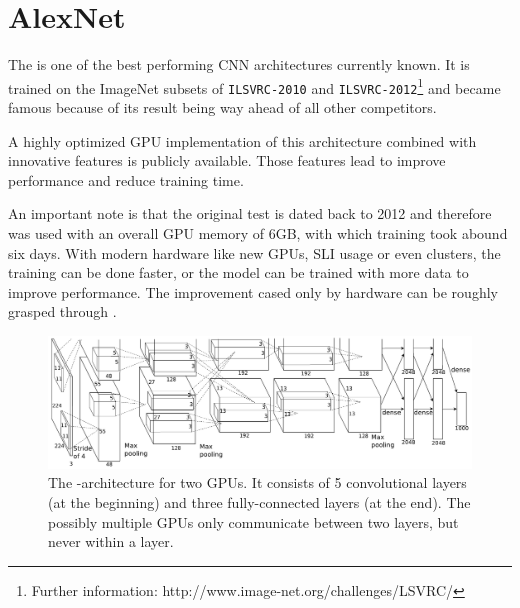 

\section{AlexNet} \label{sec: AlexNet}

The \textit{\alexnet} is one of the best performing CNN architectures currently known. It is trained on the ImageNet subsets of \texttt{ILSVRC-2010} and \texttt{ILSVRC-2012}\footnote{Further information: http://www.image-net.org/challenges/LSVRC/} and became famous because of its result being way ahead of all other competitors.

A highly optimized GPU implementation of this architecture combined with innovative features is publicly available. Those features lead to improve performance and reduce training time.\cite{krizhevsky2012imagenet}

An important note is that the original test is dated back to 2012 and therefore was used with an overall GPU memory of 6GB, with which training took abound six days. With modern hardware like new GPUs, SLI usage or even clusters, the training can be done faster, or the model can be trained with more data to improve performance. The improvement cased only by hardware can be roughly grasped through \cite{sze2017hardware}.


\begin{figure}[ht]
	\includegraphics[scale = 0.5]{src/pic/AlexNet-structure.PNG}
	\caption{The \alexnet-architecture for two GPUs. It consists of 5 convolutional layers (at the beginning) and three fully-connected layers (at the end). The possibly multiple GPUs only communicate between two layers, but never within a layer.\cite{krizhevsky2012imagenet}}
	\label{pic: AlexNet}
\end{figure}